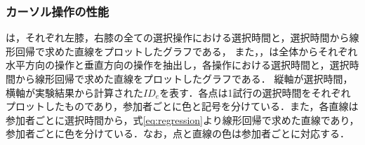 \documentclass[submit, techrep]{ipsj}
\begin{document}
\subsubsection{カーソル操作の性能}
は，それぞれ左膝，右膝の全ての選択操作における選択時間と，選択時間から線形回帰で求めた直線をプロットしたグラフである，
また，，は全体からそれぞれ水平方向の操作と垂直方向の操作を抽出し，各操作における選択時間と，選択時間から線形回帰で求めた直線をプロットしたグラフである．
縦軸が選択時間，横軸が実験結果から計算された$ID_e$を表す．各点は1試行の選択時間をそれぞれプロットしたものであり，参加者ごとに色と記号を分けている．また，各直線は参加者ごとに選択時間から，式\ref{eq:regression}より線形回帰で求めた直線であり，参加者ごとに色を分けている．なお，点と直線の色は参加者ごとに対応する．

\end{document}
